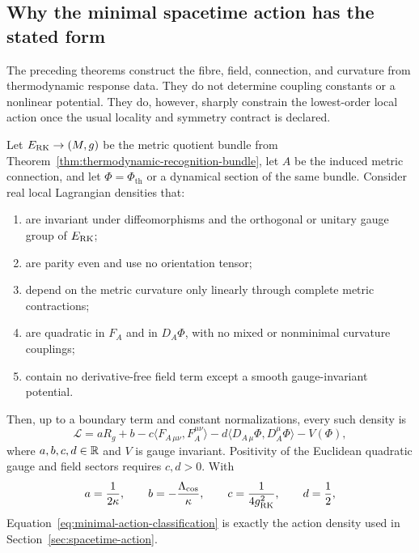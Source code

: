 \subsection{Why the minimal spacetime action has the stated form}

The preceding theorems construct the fibre, field, connection, and curvature from thermodynamic response data.  They do not determine coupling constants or a nonlinear potential.  They do, however, sharply constrain the lowest-order local action once the usual locality and symmetry contract is declared.

\begin{theorem}
\label{thm:minimal-action-classification}
Let $E_{\mathrm{RK}}\to(M,g)$ be the metric quotient bundle from Theorem~\ref{thm:thermodynamic-recognition-bundle}, let $A$ be the induced metric connection, and let $\Phi=\Phi_{\mathrm{th}}$ or a dynamical section of the same bundle.  Consider real local Lagrangian densities that:
\begin{enumerate}[label=(\roman*)]
\item are invariant under diffeomorphisms and the orthogonal or unitary gauge group of $E_{\mathrm{RK}}$;
\item are parity even and use no orientation tensor;
\item depend on the metric curvature only linearly through complete metric contractions;
\item are quadratic in $F_A$ and in $D_A\Phi$, with no mixed or nonminimal curvature couplings;
\item contain no derivative-free field term except a smooth gauge-invariant potential.
\end{enumerate}
Then, up to a boundary term and constant normalizations, every such density is
\begin{equation}
\mathcal L
=
 aR_g+b
-c\langle F_{A\,\mu\nu},F_A^{\mu\nu}\rangle
-d\langle D_{A\,\mu}\Phi,D_A^\mu\Phi\rangle
-V(\Phi),
\label{eq:minimal-action-classification}
\end{equation}
where $a,b,c,d\in\mathbb R$ and $V$ is gauge invariant.  Positivity of the Euclidean quadratic gauge and field sectors requires $c,d>0$.  With
\[
a=\frac1{2\kappa},\qquad
b=-\frac{\Lambda_{\mathrm{cos}}}{\kappa},\qquad
c=\frac1{4g_{\mathrm{RK}}^2},\qquad
d=\frac12,
\]
Equation~\eqref{eq:minimal-action-classification} is exactly the action density used in Section~\ref{sec:spacetime-action}.
\end{theorem}

